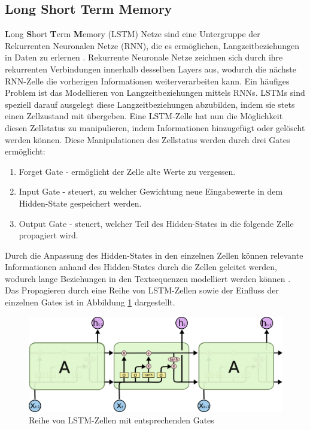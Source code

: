 \subsection{\textbf{L}ong \textbf{S}hort \textbf{T}erm \textbf{M}emory}
\textbf{L}ong \textbf{S}hort \textbf{T}erm \textbf{M}emory (LSTM) Netze sind eine Untergruppe der Rekurrenten Neuronalen Netze (RNN), die es ermöglichen, Langzeitbeziehungen in Daten zu erlernen \citep{lstm}.
Rekurrente Neuronale Netze zeichnen sich durch ihre rekurrenten Verbindungen innerhalb desselben Layers aus, wodurch die nächste RNN-Zelle die vorherigen Informationen weiterverarbeiten kann.
Ein häufiges Problem ist das Modellieren von Langzeitbeziehungen mittels RNNs. 
LSTMs sind speziell darauf ausgelegt diese Langzeitbeziehungen abzubilden, indem sie stets einen Zellzustand mit übergeben.
Eine LSTM-Zelle hat nun die Möglichkeit diesen Zellstatus zu manipulieren, indem Informationen hinzugefügt oder gelöscht werden können.
Diese Manipulationen des Zellstatus werden durch drei Gates ermöglicht:
\begin{enumerate}
    \item Forget Gate - ermöglicht der Zelle alte Werte zu vergessen.
    \item Input Gate - steuert, zu welcher Gewichtung neue Eingabewerte in dem Hidden-State gespeichert werden.
    \item Output Gate - steuert, welcher Teil des Hidden-States in die folgende Zelle propagiert wird.
\end{enumerate}

Durch die Anpassung des Hidden-States in den einzelnen Zellen können relevante Informationen anhand des Hidden-States durch die Zellen geleitet werden, wodurch lange Beziehungen in den Textsequenzen modelliert werden können \citep{lstmexplained}.
Das Propagieren durch eine Reihe von LSTM-Zellen sowie der Einfluss der einzelnen Gates ist in Abbildung \ref{lstm_chain} dargestellt.


\begin{figure}[h]
    
    \centering
    \includegraphics[width=\textwidth]{bilder/LSTM3-chain}
    \caption{Reihe von LSTM-Zellen mit entsprechenden Gates \citep{lstmexplained}}
    \label{lstm_chain}
\end{figure}

\pagebreak

